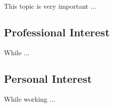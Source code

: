 This topic is very important ...

\subsection{Professional Interest}
While  ...\\

\subsection{Personal Interest}
While working ...\\ 
